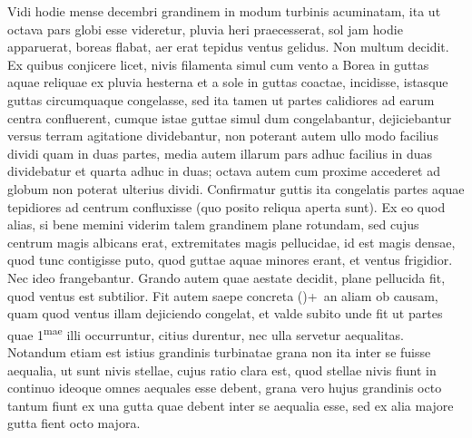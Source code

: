 \pend%
\vspace{0.5em}%
\normalsize%
\pstart%
%
%
Vidi hodie mense decembri grandinem in modum turbinis acuminatam, ita ut octava pars globi esse videretur, pluvia heri praecesserat, sol jam hodie apparuerat, boreas flabat, aer erat tepidus ventus gelidus. Non multum decidit. Ex quibus conjicere licet, nivis filamenta simul cum vento a Borea in guttas aquae reliquae ex pluvia hesterna et a sole in guttas coactae, incidisse, istasque guttas circumquaque congelasse, sed ita tamen ut partes calidiores ad earum centra confluerent, cumque istae guttae simul dum congelabantur, dejiciebantur versus terram agitatione dividebantur, non poterant autem ullo modo facilius dividi quam in duas partes, media autem illarum pars adhuc facilius in duas dividebatur et quarta adhuc in duas; octava autem cum proxime accederet ad globum non poterat ulterius dividi. Confirmatur guttis ita congelatis partes aquae tepidiores ad centrum confluxisse (quo posito reliqua aperta sunt). Ex eo quod alias, si bene memini viderim talem grandinem plane rotundam, sed cujus centrum magis albicans erat, extremitates
magis pellucidae, id est magis densae, quod tunc contigisse puto, quod guttae aquae minores erant, et ventus frigidior. Nec ideo frangebantur.
\pend%
\pstart%
Grando autem quae aestate decidit, plane pellucida fit, quod ventus est subtilior.
Fit autem saepe concreta (\phantom)\hspace{-1.2mm}+~an
aliam ob causam,
quam quod ventus illam dejiciendo congelat, et valde subito unde fit ut partes quae 1\textsuperscript{mae} illi occurruntur, citius durentur, nec ulla servetur aequalitas.
\pend%
\newpage
\pstart%
Notandum etiam est istius grandinis turbinatae grana non ita inter se fuisse aequalia, ut sunt nivis stellae, cujus ratio clara est, quod stellae nivis fiunt in continuo ideoque omnes aequales esse debent, grana vero hujus grandinis octo tantum fiunt ex una gutta quae debent inter se aequalia esse, sed ex alia majore gutta fient octo majora.
